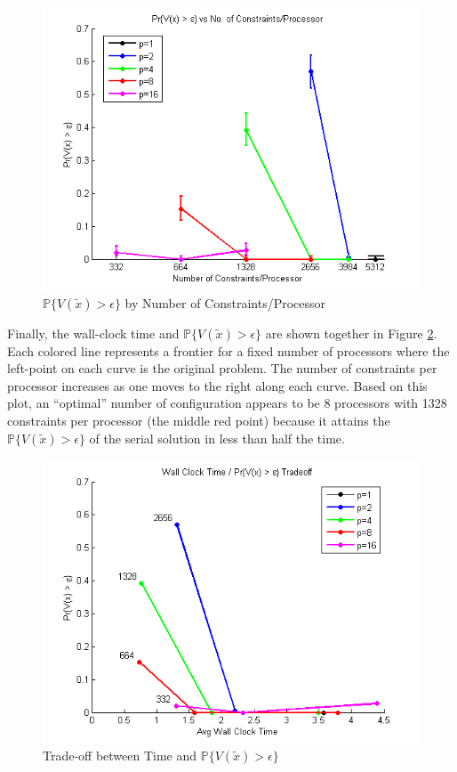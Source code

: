 \documentclass[12pt]{article}
\begin{document}
\begin{figure}[ht]
	\centering
		\includegraphics[scale=0.9]{../plot/figs/probviolprobgreateps_numconstraint.png}
	\caption{$\mathbb{P}\{V(\tilde{x}) > \epsilon \}$ by Number of Constraints/Processor}
	\label{fig:probviolprobgreateps_numconstraint}
\end{figure}

Finally, the wall-clock time and $\mathbb{P}\{V(\tilde{x}) > \epsilon \}$ are shown together in Figure \ref{fig:wct_probviolprobgreateps_frontier_constraint}.
Each colored line represents a frontier for a fixed number of processors where the left-point on each curve is the original problem.
The number of constraints per processor increases as one moves to the right along each curve.
Based on this plot, an ``optimal'' number of configuration appears to be 8 processors with 1328 constraints per processor (the middle red point) because it attains the $\mathbb{P}\{V(\tilde{x}) > \epsilon \}$ of the serial solution in less than half the time.

\begin{figure}[ht]
	\centering
		\includegraphics[scale=0.9]{../plot/figs/wct_probviolprobgreateps_frontier_constraint.png}
	\caption{Trade-off between Time and $\mathbb{P}\{V(\tilde{x}) > \epsilon \}$}
	\label{fig:wct_probviolprobgreateps_frontier_constraint}
\end{figure}
\end{document}
